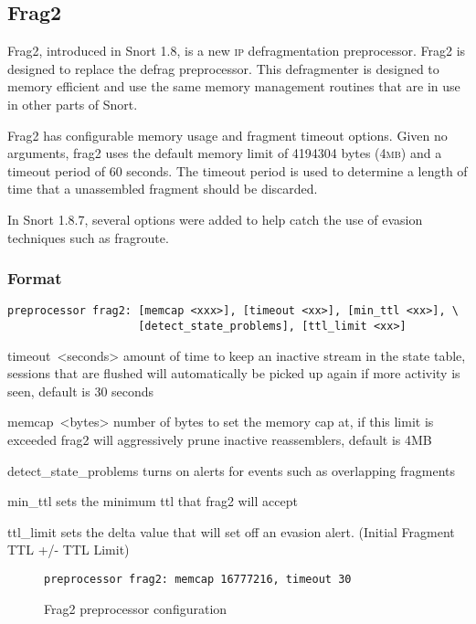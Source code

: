 \documentclass[english]{report}
\begin{document}
\subsection{Frag2\label{frag2 section}}

Frag2, introduced in Snort 1.8, is a new \textsc{ip} defragmentation
preprocessor. Frag2 is designed to replace the defrag preprocessor.
This defragmenter is designed to memory efficient and use the same
memory management routines that are in use in other parts of Snort. 

Frag2 has configurable memory usage and fragment timeout options.
Given no arguments, frag2 uses the default memory limit of 4194304
bytes (4\textsc{mb}) and a timeout period of 60 seconds. The timeout
period is used to determine a length of time that a unassembled fragment
should be discarded.

In Snort 1.8.7, several options were added to help catch the use of
evasion techniques such as fragroute. 


\subsubsection{Format}

\begin{verbatim}
preprocessor frag2: [memcap <xxx>], [timeout <xx>], [min_ttl <xx>], \
                    [detect_state_problems], [ttl_limit <xx>] 
\end{verbatim}
\begin{list}{}
\item [timeout~<seconds>]amount of time to keep an inactive stream in
the state table, sessions that are flushed will automatically be picked
up again if more activity is seen, default is 30 seconds
\item [memcap~<bytes>]number of bytes to set the memory cap at, if this
limit is exceeded frag2 will aggressively prune inactive reassemblers,
default is 4MB
\item [detect\_state\_problems]turns on alerts for events such as overlapping
fragments
\item [min\_ttl]sets the minimum ttl that frag2 will accept
\item [ttl\_limit]sets the delta value that will set off an evasion alert.
(Initial Fragment TTL +/- TTL Limit) 
\end{list}
%
\begin{figure}[!hbpt]
\begin{verbatim}
preprocessor frag2: memcap 16777216, timeout 30
\end{verbatim}

\caption{Frag2 preprocessor configuration \label{frag2 example}}
\end{figure}
\end{document}
